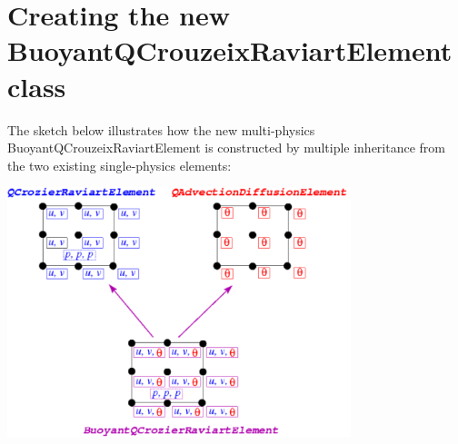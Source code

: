  

\hypertarget{index_element}{}\section{Creating the new Buoyant\+Q\+Crouzeix\+Raviart\+Element class}\label{index_element}
The sketch below illustrates how the new multi-\/physics {\ttfamily Buoyant\+Q\+Crouzeix\+Raviart\+Element} is constructed by multiple inheritance from the two existing single-\/physics elements\+:

 
\begin{DoxyImage}
\includegraphics[width=0.75\textwidth]{multi_physics}
\end{DoxyImage}




